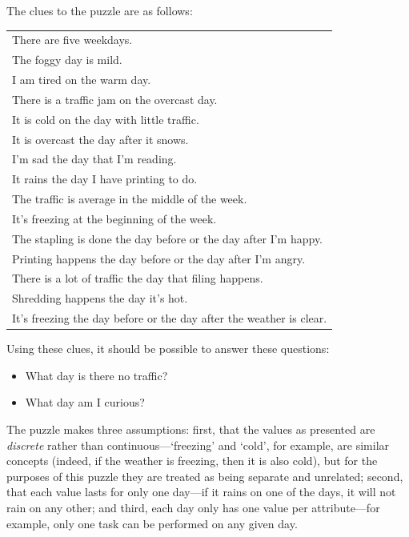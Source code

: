 \documentclass[a4paper,12pt,leqno]{article}
\begin{document}
\noindent
The clues to the puzzle are as follows:
\begin{center}
	\begin{tabular}[h!]{|l|}
		\hline
		There are five weekdays.\\
		The foggy day is mild.\\
		I am tired on the warm day.\\
		There is a traffic jam on the overcast day.\\
		It is cold on the day with little traffic.\\
		It is overcast the day after it snows.\\
		I'm sad the day that I'm reading.\\
		It rains the day I have printing to do.\\
		The traffic is average in the middle of the week.\\
		It's freezing at the beginning of the week.\\
		The stapling is done the day before or the day after I'm happy.\\
		Printing happens the day before or the day after I'm angry.\\
		There is a lot of traffic the day that filing happens.\\
		Shredding happens the day it's hot.\\
		It's freezing the day before or the day after the weather is clear.\\
		\hline
	\end{tabular}
\end{center}

Using these clues, it should be possible to answer these questions:
\begin{itemize}
	\item What day is there no traffic?
	\item What day am I curious? 
\end{itemize}
The puzzle makes three assumptions: first, that the values as presented are \textit{discrete} rather than continuous---`freezing' and `cold', for example, are similar concepts (indeed, if the weather is freezing, then it is also cold), but for the purposes of this puzzle they are treated as being separate and unrelated; second, that each value lasts for only one day---if it rains on one of the days, it will not rain on any other; and third, each day only has one value per attribute---for example, only one task can be performed on any given day.
\end{document}
